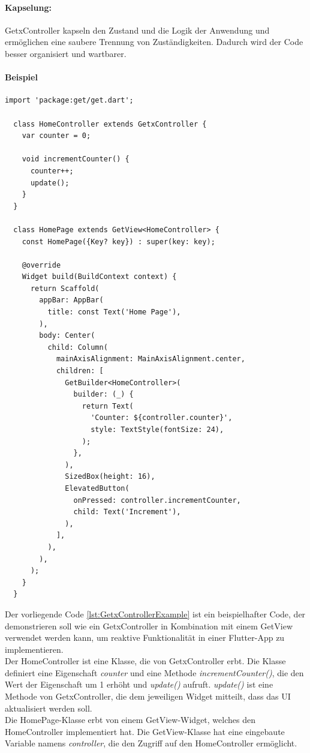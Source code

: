 \paragraph{Kapselung:}
GetxController kapseln den Zustand und die Logik der Anwendung und ermöglichen eine saubere Trennung von Zuständigkeiten. Dadurch wird der Code besser organisiert und wartbarer.
\\
\paragraph{Beispiel}
\begin{lstlisting}[caption=Beispiel zum Einsatz von einem GetxController in Kombination mit GetView,label=lst:GetxControllerExample]
  import 'package:get/get.dart';

  class HomeController extends GetxController {
    var counter = 0;

    void incrementCounter() {
      counter++;
      update();
    }
  }

  class HomePage extends GetView<HomeController> {
    const HomePage({Key? key}) : super(key: key);

    @override
    Widget build(BuildContext context) {
      return Scaffold(
        appBar: AppBar(
          title: const Text('Home Page'),
        ),
        body: Center(
          child: Column(
            mainAxisAlignment: MainAxisAlignment.center,
            children: [
              GetBuilder<HomeController>(
                builder: (_) {
                  return Text(
                    'Counter: ${controller.counter}',
                    style: TextStyle(fontSize: 24),
                  );
                },
              ),
              SizedBox(height: 16),
              ElevatedButton(
                onPressed: controller.incrementCounter,
                child: Text('Increment'),
              ),
            ],
          ),
        ),
      );
    }
  }
\end{lstlisting}
Der vorliegende Code \ref{lst:GetxControllerExample} ist ein beispielhafter Code, der demonstrieren soll wie ein GetxController in Kombination mit einem GetView verwendet werden kann, um reaktive Funktionalität in einer Flutter-App zu implementieren.
\\
Der HomeController ist eine Klasse, die von GetxController erbt. Die Klasse definiert eine Eigenschaft \textit{counter} und eine Methode \textit{incrementCounter()}, die den Wert der Eigenschaft um 1 erhöht und \textit{update()} aufruft. \textit{update()} ist eine Methode von GetxController, die dem jeweiligen Widget mitteilt, dass das UI aktualisiert werden soll.
\\
Die HomePage-Klasse erbt von einem GetView-Widget, welches den HomeController implementiert hat. Die GetView-Klasse hat eine eingebaute Variable namens \textit{controller}, die den Zugriff auf den HomeController ermöglicht.


